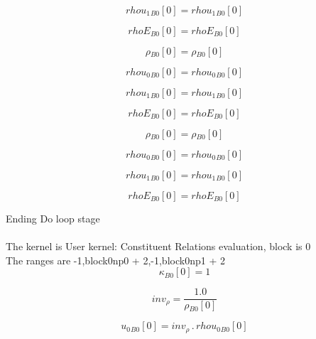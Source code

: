 \documentclass{article}
\begin{document}
\begin{dmath}{rhou_{1}{_{B0}}}[{0}] = {rhou_{1}{_{B0}}}[{0}]\end{dmath}

\begin{dmath}{rhoE{_{B0}}}[{0}] = {rhoE{_{B0}}}[{0}]\end{dmath}

\begin{dmath}{\rho{_{B0}}}[{0}] = {\rho{_{B0}}}[{0}]\end{dmath}

\begin{dmath}{rhou_{0}{_{B0}}}[{0}] = {rhou_{0}{_{B0}}}[{0}]\end{dmath}

\begin{dmath}{rhou_{1}{_{B0}}}[{0}] = {rhou_{1}{_{B0}}}[{0}]\end{dmath}

\begin{dmath}{rhoE{_{B0}}}[{0}] = {rhoE{_{B0}}}[{0}]\end{dmath}

\begin{dmath}{\rho{_{B0}}}[{0}] = {\rho{_{B0}}}[{0}]\end{dmath}

\begin{dmath}{rhou_{0}{_{B0}}}[{0}] = {rhou_{0}{_{B0}}}[{0}]\end{dmath}

\begin{dmath}{rhou_{1}{_{B0}}}[{0}] = {rhou_{1}{_{B0}}}[{0}]\end{dmath}

\begin{dmath}{rhoE{_{B0}}}[{0}] = {rhoE{_{B0}}}[{0}]\end{dmath}

\noindent Ending Do loop stage\\
\\\noindent The kernel is User kernel: Constituent Relations evaluation, block is 0\\\noindent The ranges are -1,block0np0 + 2,-1,block0np1 + 2\\\begin{dmath}{\kappa{_{B0}}}[{0}] = 1\end{dmath}

\begin{dmath}inv_{\rho} = \frac{1.0}{{\rho{_{B0}}}[{0}]}\end{dmath}

\begin{dmath}{u_{0}{_{B0}}}[{0}] = inv_{\rho} \,.\, {rhou_{0}{_{B0}}}[{0}]\end{dmath}
\end{document}
